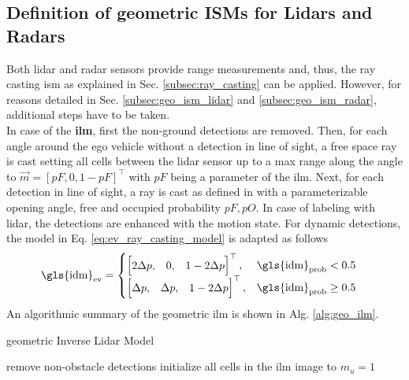 \subsection{Definition of geometric ISMs for Lidars and Radars}
\label{subsec:method_geo_isms}
Both lidar and radar sensors provide range measurements and, thus, the ray casting \gls{ism} as explained in Sec. \ref{subsec:ray_casting} can be applied. However, for reasons detailed in Sec. \ref{subsec:geo_ism_lidar} and \ref{subsec:geo_ism_radar}, additional steps have to be taken. 
\\
In case of the \textbf{\gls{ilm}}, first the non-ground detections are removed. Then, for each angle around the ego vehicle without a detection in line of sight, a free space ray is cast setting all cells between the lidar sensor up to a max range along the angle to $\vec{m}=[pF,0,1-pF]^\top$ with $pF$ being a parameter of the \gls{ilm}. Next, for each detection in line of sight, a ray is cast as defined in \cite{pagac1996evidential} with a parameterizable opening angle, free and occupied probability $pF, pO$. In case of labeling with lidar, the detections are enhanced with the motion state. For dynamic detections, the model in Eq. \ref{eq:ev_ray_casting_model} is adapted as follows
\begin{align}
	\label{eq:ev_ray_casting_model_for_dy}
	\text{\gls{idm}}_{\text{ev}} &=
	\begin{cases}
		\begin{bmatrix} 2\Delta p, &0, &1 - 2\Delta p \end{bmatrix}^{\top}, & \text{\gls{idm}}_{\text{prob}} < 0.5 \\
		\begin{bmatrix} \Delta p, &\Delta p, &1 - 2\Delta p \end{bmatrix}^{\top}, & \text{\gls{idm}}_{\text{prob}} \geq 0.5
	\end{cases} 
\end{align} 
An algorithmic summary of the geometric \gls{ilm} is shown in Alg. \ref{alg:geo_ilm}.\\
\begin{algorithm}
	\caption{\label{alg:geo_ilm}geometric Inverse Lidar Model}
	remove non-obstacle detections\;
	initialize all cells in the \gls{ilm} image to $m_u=1$\;
\end{algorithm}
